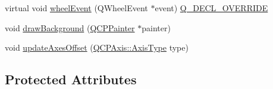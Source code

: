 \begin{DoxyCompactItemize}
\item 
virtual void \mbox{\hyperlink{class_q_c_p_axis_rect_a93eeaa0c127d6d6fe8171b2455080262}{wheel\+Event}} (Q\+Wheel\+Event $\ast$event) \mbox{\hyperlink{qcustomplot_8h_a42cc5eaeb25b85f8b52d2a4b94c56f55}{Q\+\_\+\+D\+E\+C\+L\+\_\+\+O\+V\+E\+R\+R\+I\+DE}}
\item 
void \mbox{\hyperlink{class_q_c_p_axis_rect_ab49d338d1ce74b476fcead5b32cf06dc}{draw\+Background}} (\mbox{\hyperlink{class_q_c_p_painter}{Q\+C\+P\+Painter}} $\ast$painter)
\item 
void \mbox{\hyperlink{class_q_c_p_axis_rect_a6024ccdc74f5dc0e8a0fe482e5b28a20}{update\+Axes\+Offset}} (\mbox{\hyperlink{class_q_c_p_axis_ae2bcc1728b382f10f064612b368bc18a}{Q\+C\+P\+Axis\+::\+Axis\+Type}} type)
\end{DoxyCompactItemize}
\subsection*{Protected Attributes}
